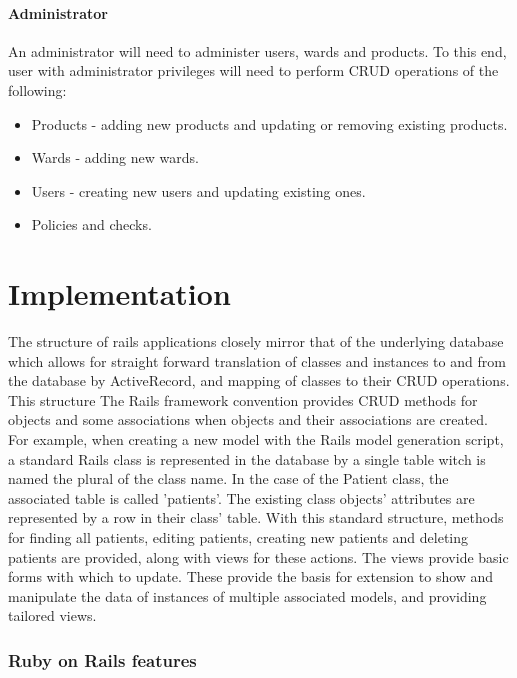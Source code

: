 \documentclass[letterpaper]{amsart}
\begin{document}
\subsection{Administrator}
An administrator will need to administer users, wards and products.  To this end, user with administrator privileges will need to perform CRUD operations of the following:
\begin{itemize}
    \item Products - adding new products and updating or removing existing products.
    \item Wards - adding new wards.
    \item Users - creating new users and updating existing ones.
    \item Policies and checks.
\end{itemize}

\part{Implementation}
The structure of rails applications closely mirror that of the underlying database which allows for straight forward translation of classes and instances to and from the database by ActiveRecord, and mapping of classes to their CRUD operations.   This structure
The Rails framework convention provides CRUD methods for objects and some associations when objects and their associations are created.  For example, when creating a new model with the Rails model generation script, a standard Rails class is represented in the database by a single table witch is named the plural of the class name.  In the case of the Patient class, the associated table is called 'patients'.  The existing class objects' attributes are represented by a row in their class' table.  With this standard structure, methods for finding all patients, editing patients, creating new patients and deleting patients are provided, along with views for these actions.  The views provide basic forms with which to update.  These provide the basis for extension to show and manipulate the data of instances of multiple associated models, and providing tailored views. 
\section{Ruby on Rails features}
\end{document}

